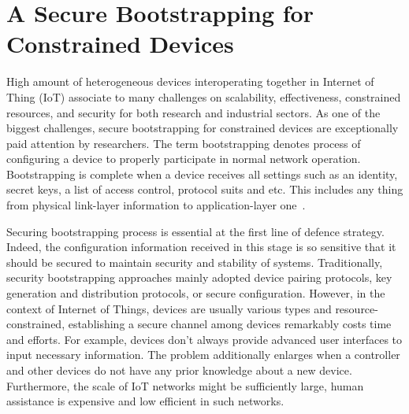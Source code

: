\chapter{A Secure Bootstrapping for Constrained Devices} %

\label{Chapter5} %



High amount of heterogeneous devices interoperating together in Internet of Thing (IoT) associate to many challenges on scalability, effectiveness, constrained resources, and security for both research and industrial sectors. As one of the biggest challenges, secure bootstrapping for constrained devices are exceptionally paid attention by researchers. The term bootstrapping denotes process of configuring a device to properly participate in normal network operation. Bootstrapping is complete when a device receives all settings such as an identity, secret keys, a list of access control, protocol suits and etc. This includes any thing from physical link-layer information to application-layer one~\cite{secureboot}. 

Securing bootstrapping process is essential at the first line of defence strategy. Indeed, the configuration information received in this stage is so sensitive that it should be secured to maintain security and stability of systems. Traditionally, security bootstrapping approaches mainly adopted device pairing protocols, key generation and distribution protocols, or secure configuration. However, in the context of Internet of Things, devices are usually various types and resource-constrained, establishing a secure channel among devices remarkably costs time and efforts. For example, devices don't always provide advanced user interfaces to input necessary information. The problem additionally enlarges when a controller and other devices do not have any prior knowledge about a new device. Furthermore, the scale of IoT networks might be sufficiently large, human assistance is expensive and low efficient in such networks.

